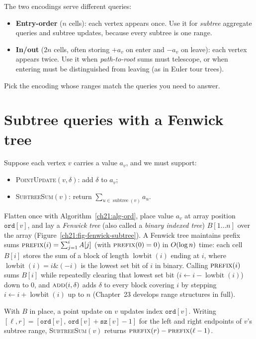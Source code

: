 \begin{focusbox}
The two encodings serve different queries:
\begin{itemize}
\item \textbf{Entry-order} ($n$ cells): each vertex appears once. Use it for \emph{subtree}
aggregate queries and subtree updates, because every subtree is one range.
\item \textbf{In/out} ($2n$ cells, often storing $+a_v$ on enter and $-a_v$ on
leave): each vertex appears twice. Use it when \emph{path-to-root} sums must telescope,
or when entering must be distinguished from leaving (as in Euler tour trees).
\end{itemize}
Pick the encoding whose ranges match the queries you need to answer.
\end{focusbox}

\section{Subtree queries with a Fenwick tree}
\label{ch21:subtree-bit}

Suppose each vertex $v$ carries a value $a_v$, and we must support:
\begin{itemize}
\item \textsc{PointUpdate}$(v,\delta)$: add $\delta$ to $a_v$;
\item \textsc{SubtreeSum}$(v)$: return $\sum_{u\in\operatorname{subtree}(v)} a_u$.
\end{itemize}
Flatten once with Algorithm~\ref{ch21:alg-ord}, place value $a_v$ at array position
$\texttt{ord}[v]$, and lay a \emph{Fenwick tree} (also called a \emph{binary indexed tree}) $B[1\dots n]$ over the array (Figure~\ref{ch21:fig-fenwick-subtree}). A Fenwick tree maintains prefix sums $\textsc{prefix}(i) = \sum_{j=1}^{i} A[j]$ (with $\textsc{prefix}(0)=0$) in $O(\log n)$ time: each cell $B[i]$ stores the sum of a block of length $\operatorname{lowbit}(i)$ ending at $i$, where $\operatorname{lowbit}(i) = i \mathbin{\&} (-i)$ is the lowest set bit of $i$ in binary. Calling $\textsc{prefix}(i)$ sums $B[i]$ while repeatedly clearing that lowest set bit ($i \leftarrow i - \operatorname{lowbit}(i)$) down to $0$, and $\textsc{add}(i,\delta)$ adds $\delta$ to every block covering $i$ by stepping $i \leftarrow i + \operatorname{lowbit}(i)$ up to $n$ (Chapter~23 develops range structures in full).

With $B$ in place, a point
update on $v$ updates index $\texttt{ord}[v]$. Writing $[\ell, r] = [\texttt{ord}[v],\,\texttt{ord}[v]+\texttt{sz}[v]-1]$ for the left and right endpoints of $v$'s subtree range, \textsc{SubtreeSum}$(v)$ returns
$\textsc{prefix}(r)-\textsc{prefix}(\ell-1)$.

